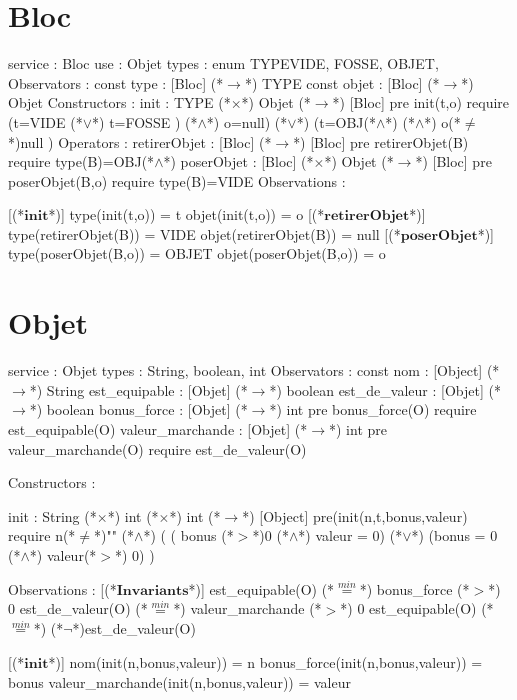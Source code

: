 \documentclass[a4paper, 11pt]{report}
\newcommand{\specB}[1]{\textbf{#1}}
\begin{document}
\section{Bloc}
\begin{Spe}
service : Bloc
use : Objet
types : enum TYPE{VIDE, FOSSE, OBJET},
Observators :
      const type : [Bloc] (*$\rightarrow$*) TYPE
      const objet : [Bloc] (*$\rightarrow$*) Objet
Constructors :
      init : TYPE (*$\times$*) Objet (*$\rightarrow$*) [Bloc]
            pre init(t,o) require 
            (t=VIDE (*$\lor$*) t=FOSSE ) (*$\land$*) o=null) (*$\lor$*) (t=OBJ(*$\land$*) (*$\land$*) o(*$\ne$*)null ) 
Operators :
      retirerObjet : [Bloc] (*$\rightarrow$*) [Bloc]
            pre retirerObjet(B) require type(B)=OBJ(*$\land$*) 
      poserObjet : [Bloc] (*$\times$*) Objet (*$\rightarrow$*) [Bloc]
            pre poserObjet(B,o) require type(B)=VIDE 
Observations :
     
      [(*$\specB{init}$*)]
            type(init(t,o)) = t
            objet(init(t,o)) = o
      [(*$\specB{retirerObjet}$*)]
            type(retirerObjet(B)) = VIDE
            objet(retirerObjet(B)) = null
      [(*$\specB{poserObjet}$*)] 
            type(poserObjet(B,o)) = OBJET
            objet(poserObjet(B,o)) = o 
     
\end{Spe}
 
\section{Objet}
\begin{Spe}


service : Objet 
types : String, boolean, int
Observators :
	const nom : [Object] (*$\rightarrow$*) String
	est_equipable : [Objet] (*$\rightarrow$*) boolean 
	est_de_valeur : [Objet] (*$\rightarrow$*) boolean
	bonus_force : [Objet] (*$\rightarrow$*) int
		pre bonus_force(O) require est_equipable(O) 
	valeur_marchande : [Objet] (*$\rightarrow$*) int
		pre valeur_marchande(O) require est_de_valeur(O)

Constructors :

	init : String (*$\times$*) int (*$\times$*) int (*$\rightarrow$*) [Object] 
		pre(init(n,t,bonus,valeur) require n(*$\ne$*)"" (*$\land$*) ( ( bonus (*$>$*)0 (*$\land$*) valeur = 0) (*$\lor$*) (bonus = 0 (*$\land$*) valeur(*$>$*) 0) ) 
                
Observations : 
	 [(*$\specB{Invariants}$*)]
	        est_equipable(O) (*$\stackrel{min}{=}$*) bonus_force (*$>$*) 0
	        est_de_valeur(O) (*$\stackrel{min}{=}$*) valeur_marchande (*$>$*) 0
	        est_equipable(O) (*$\stackrel{min}{=}$*) (*$\lnot$*)est_de_valeur(O)
	        
	 [(*$\specB{init}$*)]
		nom(init(n,bonus,valeur)) = n 
		bonus_force(init(n,bonus,valeur)) = bonus 
		valeur_marchande(init(n,bonus,valeur)) = valeur 

\end{Spe}
\end{document}
